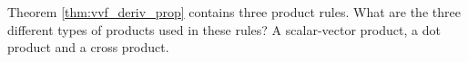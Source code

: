 {Theorem \ref{thm:vvf_deriv_prop} contains three product rules. What are the three different types of products used in these rules?
}
{A scalar-vector product, a dot product and a cross product.
}
